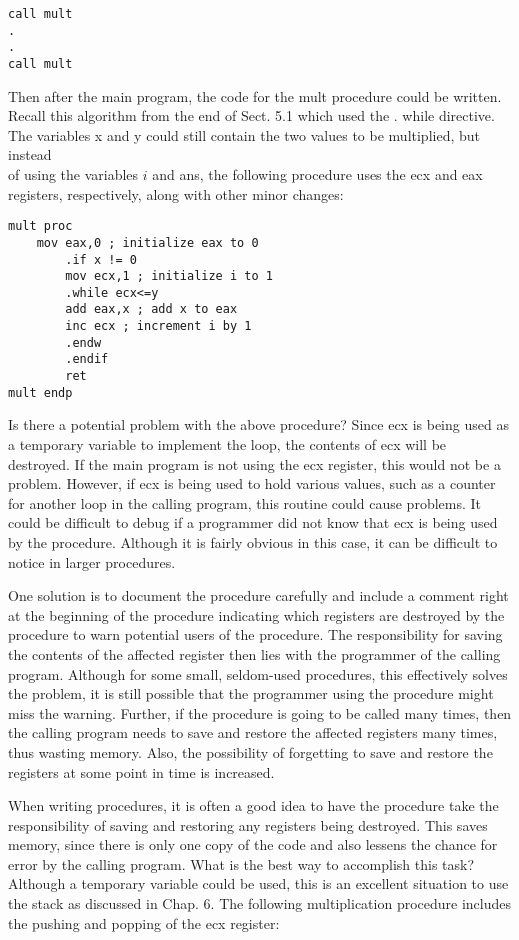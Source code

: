 \documentclass[10pt]{article}
\begin{document}
\begin{verbatim}
call mult
.
.
call mult
\end{verbatim}

Then after the main program, the code for the mult procedure could be written. Recall this algorithm from the end of Sect. 5.1 which used the . while directive. The variables x and y could still contain the two values to be multiplied, but instead\\
of using the variables $i$ and ans, the following procedure uses the ecx and eax registers, respectively, along with other minor changes:

\begin{verbatim}
mult proc
    mov eax,0 ; initialize eax to 0
        .if x != 0
        mov ecx,1 ; initialize i to 1
        .while ecx<=y
        add eax,x ; add x to eax
        inc ecx ; increment i by 1
        .endw
        .endif
        ret
mult endp
\end{verbatim}

Is there a potential problem with the above procedure? Since ecx is being used as a temporary variable to implement the loop, the contents of ecx will be destroyed. If the main program is not using the ecx register, this would not be a problem. However, if ecx is being used to hold various values, such as a counter for another loop in the calling program, this routine could cause problems. It could be difficult to debug if a programmer did not know that ecx is being used by the procedure. Although it is fairly obvious in this case, it can be difficult to notice in larger procedures.

One solution is to document the procedure carefully and include a comment right at the beginning of the procedure indicating which registers are destroyed by the procedure to warn potential users of the procedure. The responsibility for saving the contents of the affected register then lies with the programmer of the calling program. Although for some small, seldom-used procedures, this effectively solves the problem, it is still possible that the programmer using the procedure might miss the warning. Further, if the procedure is going to be called many times, then the calling program needs to save and restore the affected registers many times, thus wasting memory. Also, the possibility of forgetting to save and restore the registers at some point in time is increased.

When writing procedures, it is often a good idea to have the procedure take the responsibility of saving and restoring any registers being destroyed. This saves memory, since there is only one copy of the code and also lessens the chance for error by the calling program. What is the best way to accomplish this task? Although a temporary variable could be used, this is an excellent situation to use the stack as discussed in Chap. 6. The following multiplication procedure includes the pushing and popping of the ecx register:
\end{document}
